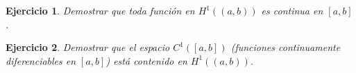 \documentclass[11pt]{report}
\newtheorem{ex}{Ejercicio}
\newenvironment{solution}{\begin{proof}[Solución]}{\end{proof}}
\newcommand{\Ldos}{L^2}
\newcommand{\Huno}{H^1}
\begin{document}






\begin{ex}
Demostrar que toda función en $\Huno((a, b))$ es continua en $[a, b]$.
\end{ex}



\begin{ex}
Demostrar que el espacio $C^1([a, b])$ (funciones continuamente diferenciables en $[a, b]$) está contenido en $\Huno((a, b))$.
\end{ex}


\end{document}
